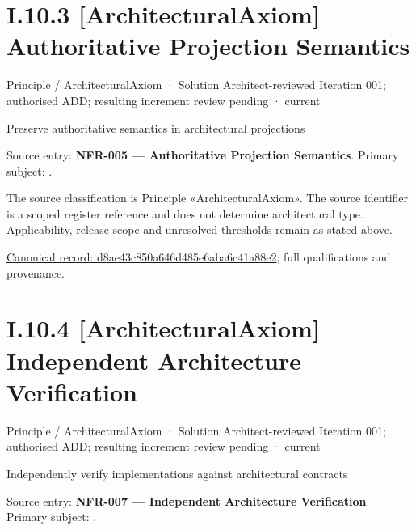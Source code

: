 \section*{I.10.3 [ArchitecturalAxiom] Authoritative Projection Semantics}
\label{navigation:I.10.3}

\label{element:d8ae43c850a646d485e6aba6c41a88e2}
{\small Principle / ArchitecturalAxiom · Solution Architect-reviewed Iteration 001; authorised ADD; resulting increment review pending · current}\par

Preserve authoritative semantics in architectural projections



Source entry: \textbf{NFR-005 — Authoritative Projection Semantics}. Primary subject: \texttt{}.



The source classification is Principle «ArchitecturalAxiom». The source identifier is a scoped register reference and does not determine architectural type. Applicability, release scope and unresolved thresholds remain as stated above.


{\footnotesize \href{../../../../continuum/motivation/principle/architectural-axiom/d8ae43c850a646d485e6aba6c41a88e2.md}{Canonical record: d8ae43c850a646d485e6aba6c41a88e2}; full qualifications and provenance.}\par
\section*{I.10.4 [ArchitecturalAxiom] Independent Architecture Verification}
\label{navigation:I.10.4}

\label{element:82d29abf230d478aaf42ecb73ecbd01e}
{\small Principle / ArchitecturalAxiom · Solution Architect-reviewed Iteration 001; authorised ADD; resulting increment review pending · current}\par

Independently verify implementations against architectural contracts



Source entry: \textbf{NFR-007 — Independent Architecture Verification}. Primary subject: \texttt{}.



